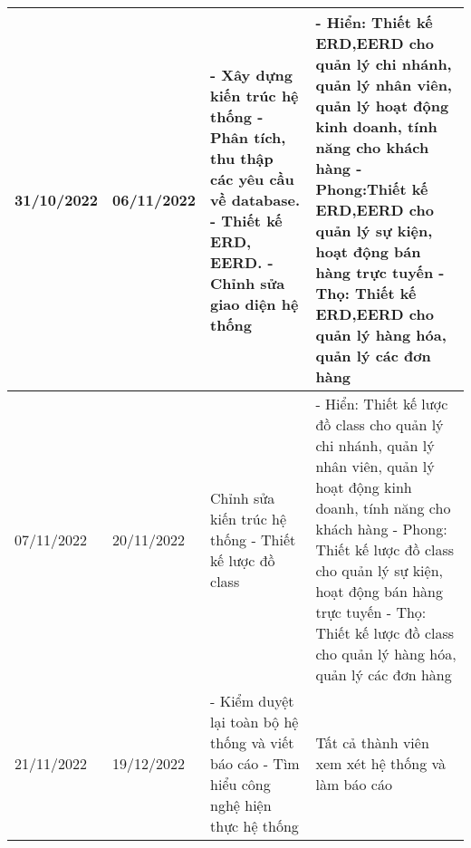 {\begin{longtable}{| p{2cm} | p{2cm} | p{4cm} | p{7cm}|}
	\hline
	31/10/2022 & 06/11/2022 & 
	- Xây dựng kiến trúc hệ thống
	\newline
	- Phân tích, thu thập các yêu cầu về database.
	\newline
	- Thiết kế ERD, EERD.
	\newline
	- Chỉnh sửa giao diện hệ thống & 
	- Hiển: Thiết kế ERD,EERD cho quản lý chi nhánh, quản lý nhân viên, quản lý hoạt động kinh doanh, tính năng cho khách hàng 
	\newline
	- Phong:Thiết kế ERD,EERD cho quản lý sự kiện, hoạt động bán hàng trực tuyến
	\newline
	- Thọ: Thiết kế ERD,EERD cho quản lý hàng hóa, quản lý các đơn hàng\\
	\hline
	07/11/2022 & 20/11/2022 & Chỉnh sửa kiến trúc hệ thống 
	\newline
	- Thiết kế lược đồ class &
	- Hiển: Thiết kế lược đồ class cho quản lý chi nhánh, quản lý nhân viên, quản lý hoạt động kinh doanh, tính năng cho khách hàng 
	\newline
	- Phong: Thiết kế lược đồ class cho quản lý sự kiện, hoạt động bán hàng trực tuyến
	\newline
	- Thọ: Thiết kế lược đồ class cho quản lý hàng hóa, quản lý các đơn hàng \\
	\hline
	21/11/2022 & 19/12/2022 &  
	- Kiểm duyệt lại toàn bộ hệ thống và viết báo cáo
	\newline
	- Tìm hiểu công nghệ hiện thực hệ thống &
	Tất cả thành viên xem xét hệ thống và làm báo cáo\\
	\hline

\end{longtable}
}